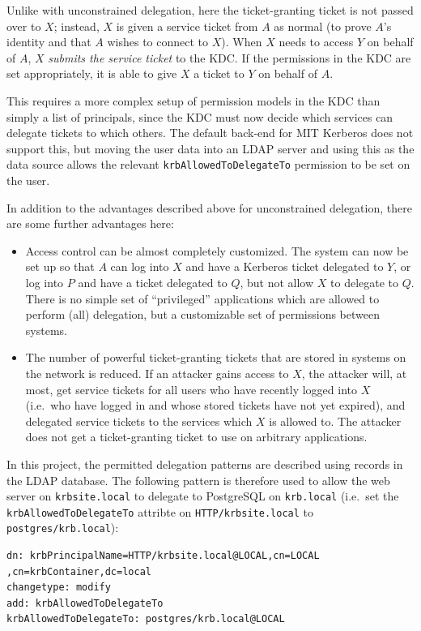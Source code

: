 \documentclass{article}
\begin{document}
Unlike with unconstrained delegation, here the ticket-granting ticket is not passed over to $X$; instead, $X$ is given a service ticket from $A$ as normal (to prove $A$'s identity and that $A$ wishes to connect to $X$). When $X$ needs to access $Y$ on behalf of $A$, $X$ \textit{submits the service ticket} to the KDC. If the permissions in the KDC are set appropriately, it is able to give $X$ a ticket to $Y$ on behalf of $A$.

This requires a more complex setup of permission models in the KDC than simply a list of principals, since the KDC must now decide which services can delegate tickets to which others. The default back-end for MIT Kerberos does not support this, but moving the user data into an LDAP server and using this as the data source allows the relevant \texttt{krbAllowedToDelegateTo} permission to be set on the user\cite{KRB-DELEG}.

In addition to the advantages described above for unconstrained delegation, there are some further advantages here:

\begin{itemize}
\item
  Access control can be almost completely customized. The system can now be set up so that $A$ can log into $X$ and have a Kerberos ticket delegated to $Y$, or log into $P$ and have a ticket delegated to $Q$, but not allow $X$ to delegate to $Q$. There is no simple set of ``privileged'' applications which are allowed to perform (all) delegation, but a customizable set of permissions between systems.
\item
  The number of powerful ticket-granting tickets that are stored in systems on the network is reduced. If an attacker gains access to $X$, the attacker will, at most, get service tickets for all users who have recently logged into $X$ (i.e.\ who have logged in and whose stored tickets have not yet expired), and delegated service tickets to the services which $X$ is allowed to. The attacker does not get a ticket-granting ticket to use on arbitrary applications.
\end{itemize}

In this project, the permitted delegation patterns are described using records in the LDAP database. The following pattern is therefore used to allow the web server on \verb+krbsite.local+ to delegate to PostgreSQL on \verb+krb.local+ (i.e.\ set the \texttt{krbAllowedToDelegateTo} attribte on \verb+HTTP/krbsite.local+ to \verb+postgres/krb.local+):

\begin{verbatim}
dn: krbPrincipalName=HTTP/krbsite.local@LOCAL,cn=LOCAL
,cn=krbContainer,dc=local
changetype: modify
add: krbAllowedToDelegateTo
krbAllowedToDelegateTo: postgres/krb.local@LOCAL
\end{verbatim}
\end{document}
